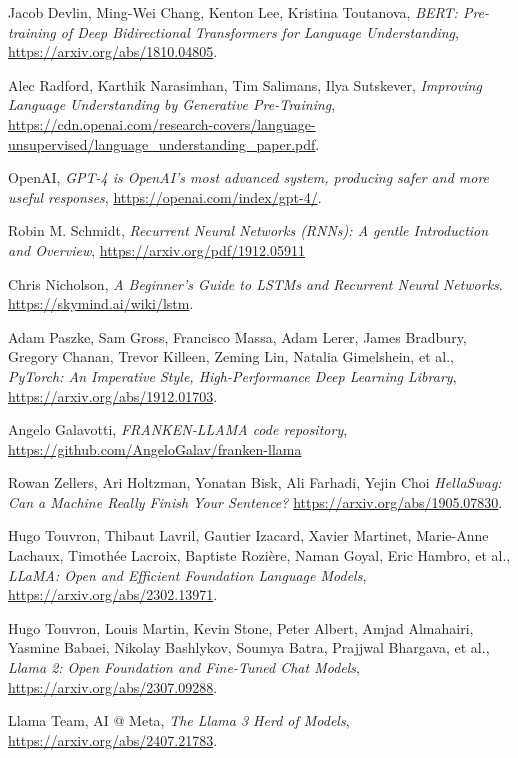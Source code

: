 \begin{thebibliography}{9}
	Jacob Devlin, Ming-Wei Chang, Kenton Lee, Kristina Toutanova,
	\textit{BERT: Pre-training of Deep Bidirectional Transformers for Language Understanding},
	\url{https://arxiv.org/abs/1810.04805}.

	Alec Radford, Karthik Narasimhan, Tim Salimans, Ilya Sutskever,
	\textit{Improving Language Understanding by Generative Pre-Training},
	\url{https://cdn.openai.com/research-covers/language-unsupervised/language_understanding_paper.pdf}.

	OpenAI,
	\textit{GPT-4 is OpenAI’s most advanced system, producing safer and more useful responses},
	\url{https://openai.com/index/gpt-4/}.

	Robin M. Schmidt,
	\textit{Recurrent Neural Networks (RNNs): A gentle Introduction and Overview},
	\url{https://arxiv.org/pdf/1912.05911}

	Chris Nicholson,
	\textit{A Beginner’s Guide to LSTMs and Recurrent Neural Networks}.
	\url{ https://skymind.ai/wiki/lstm}.

	Adam Paszke, Sam Gross, Francisco Massa, Adam Lerer, James Bradbury, Gregory Chanan, Trevor Killeen, Zeming Lin, Natalia Gimelshein, et al.,
	\textit{PyTorch: An Imperative Style, High-Performance Deep Learning Library},
	\url{https://arxiv.org/abs/1912.01703}.

	Angelo Galavotti,
	\textit{FRANKEN-LLAMA code repository},
	\url{https://github.com/AngeloGalav/franken-llama}

	Rowan Zellers, Ari Holtzman, Yonatan Bisk, Ali Farhadi, Yejin Choi
	\textit{HellaSwag: Can a Machine Really Finish Your Sentence?}
	\url{https://arxiv.org/abs/1905.07830}.

	Hugo Touvron, Thibaut Lavril, Gautier Izacard, Xavier Martinet, Marie-Anne Lachaux, Timothée Lacroix, Baptiste Rozière, Naman Goyal, Eric Hambro, et al.,
	\textit{LLaMA: Open and Efficient Foundation Language Models},
	\url{https://arxiv.org/abs/2302.13971}.

	Hugo Touvron, Louis Martin, Kevin Stone, Peter Albert, Amjad Almahairi, Yasmine Babaei, Nikolay Bashlykov, Soumya Batra, Prajjwal Bhargava, et al.,
	\textit{Llama 2: Open Foundation and Fine-Tuned Chat Models},
	\url{https://arxiv.org/abs/2307.09288}.

	Llama Team, AI @ Meta,
	\textit{The Llama 3 Herd of Models},
	\url{https://arxiv.org/abs/2407.21783}.


\end{thebibliography}
